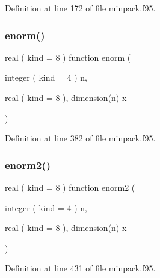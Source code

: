 Definition at line 172 of file minpack.\+f95.

\mbox{\label{minpack_8f95_a77bab828c23542feaca9eb2756475b89}} 
\subsubsection{\texorpdfstring{enorm()}{enorm()}}
{\footnotesize\ttfamily real ( kind = 8 ) function enorm (\begin{DoxyParamCaption}\item[{integer ( kind = 4 )}]{n,  }\item[{real ( kind = 8 ), dimension(n)}]{x }\end{DoxyParamCaption})}



Definition at line 382 of file minpack.\+f95.

\mbox{\label{minpack_8f95_a83e8b436deaf6a3de9bdf38fc2962d9a}} 
\subsubsection{\texorpdfstring{enorm2()}{enorm2()}}
{\footnotesize\ttfamily real ( kind = 8 ) function enorm2 (\begin{DoxyParamCaption}\item[{integer ( kind = 4 )}]{n,  }\item[{real ( kind = 8 ), dimension(n)}]{x }\end{DoxyParamCaption})}



Definition at line 431 of file minpack.\+f95.

\mbox{\label{minpack_8f95_a327303574ddecf90e74bf7aaa64b5509}} 
